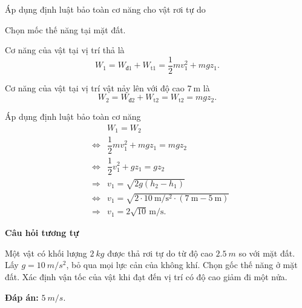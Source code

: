 \begin{dang}{Áp dụng định luật bảo toàn cơ năng cho vật rơi tự do }
{		Chọn mốc thế năng tại mặt đất.
		
		Cơ năng của vật tại vị trí thả là
		\begin{equation*}
			W_1=W_\text{đ1}+W_\text{t1}=\dfrac{1}{2}mv_1^2+mgz_1.
		\end{equation*}
		
		Cơ năng của vật tại vị trí vật nảy lên với độ cao $\SI{7}{\meter}$ là
		\begin{equation*}
			W_2=W_\text{đ2}+W_\text{t2}=W_\text{t2}=mgz_2.
		\end{equation*}
		
		Áp dụng định luật bảo toàn cơ năng
		\begin{eqnarray*}
			&&W_1=W_2\\
			&\Leftrightarrow& \dfrac{1}{2}mv_1^2+mgz_1 = mgz_2\\
			&\Leftrightarrow& \dfrac{1}{2}v_1^2+gz_1 = gz_2\\
			&\Rightarrow& v_1 = \sqrt{2g(h_2-h_1)}\\
			&\Leftrightarrow& v_1 = \sqrt{2\cdot\SI{10}{\meter/\second^2}\cdot(\SI{7}{\meter}-\SI{5}{\meter})}\\
			&\Rightarrow& v_1 = 2\sqrt{10}\,\text{m/s}.
		\end{eqnarray*}
		
		\begin{center}
			\textbf{Câu hỏi tương tự}
		\end{center}
		
		Một vật có khối lượng $\SI{2}{kg}$ được thả rơi tự do từ độ cao $\SI{2.5}{m}$ so với mặt đất. Lấy $g=\SI{10}{m/s^2}$, bỏ qua mọi lực cản của không khí. Chọn gốc thế năng ở mặt đất. Xác định vận tốc của vật khi đạt đến vị trí có độ cao giảm đi một nửa.
		
		\textbf{Đáp án: } $\SI{5}{m/s}$.
	}
\end{dang}

